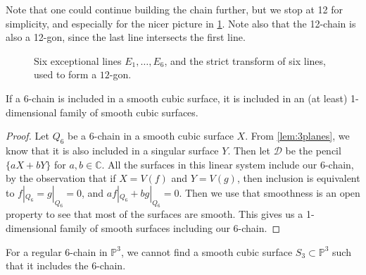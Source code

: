 Note that one could continue building the chain further, but we stop at 12 for simplicity, and especially for the nicer picture in \cref{fig:12chain}. Note also that the 12-chain is also a 12-gon, since the last line intersects the first line.

\begin{figure}%
    \centering
    
    \caption{Six exceptional lines $E_1,\dots,E_6$, and the strict transform of six lines, used to form a $12$-gon.}
    \label{fig:12chain}
\end{figure}

\begin{lemma}\label{lem:1dim}
    If a 6-chain is included in a smooth cubic surface, it is included in an (at least) 1-dimensional family of smooth cubic surfaces.
\end{lemma}
\begin{proof}
    Let $Q_6$ be a 6-chain in a smooth cubic surface $X$. From \cref{lem:3planes}, we know that it is also included in a singular surface $Y$. Then let $\mathcal{D}$ be the pencil $\{aX + bY\}$ for $a, b \in \mathbb{C}$. All the surfaces in this linear system include our 6-chain, by the observation that if $X = V(f)$ and $Y = V(g)$, then inclusion is equivalent to $f|_{Q_6} = g|_{Q_6} = 0$, and $af|_{Q_6} + bg|_{Q_6} = 0$. Then we use that smoothness is an open property to see that most of the surfaces are smooth. This gives us a 1-dimensional family of smooth surfaces including our 6-chain.
\end{proof}

\begin{proposition}\label{prop:6chain}
    For a regular 6-chain in $\mathbb{P}^3$, we cannot find a smooth cubic surface $ S_3 \subset \mathbb{P}^3$ such that it includes the 6-chain.
\end{proposition}




